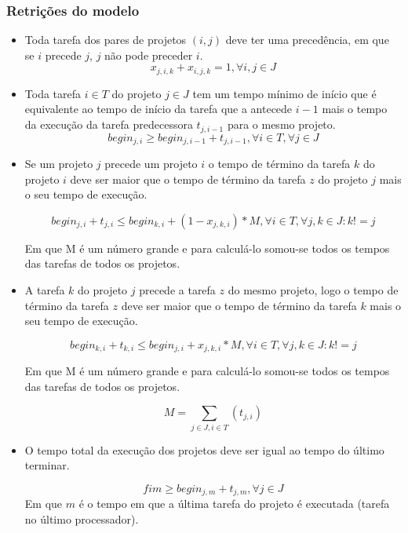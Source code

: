\documentclass[11pt,letterpaper]{article}
\begin{document}
\subsubsection*{Retrições do modelo}
\begin{itemize}
\item Toda tarefa dos pares de projetos $(i,j)$ deve ter uma precedência, em que se $i$
  precede $j$, $j$ não pode preceder $i$. 
\begin{equation*}
  x_{j,i,k}+x_{i,j,k}=1, \forall i,j \in J
\end{equation*}

\item Toda tarefa $i \in T$ do projeto  $j \in J$ tem um tempo mínimo de início que é equivalente ao tempo de início da tarefa que a antecede $i -1$ mais o tempo da execução da tarefa predecessora $ t_{j,i-1}$ para o mesmo projeto. 
\begin{equation*}
  begin_{j,i} \geq begin_{j,i-1}+ t_{j,i-1}, \forall i \in T, \forall j \in J
\end{equation*}

\item Se um projeto $j$ precede um projeto $i$ o tempo de término da
  tarefa $k$ do projeto $i$ deve ser maior que o tempo de término da
  tarefa $z$ do projeto $j$ mais o seu tempo de execução.
 
\begin{equation*}
  begin_{j,i} + t_{j,i} \leq begin_{k,i}+(1-x_{j,k,i})*M, \forall i \in T, \forall j,k \in J  : k!=j 
\end{equation*}


Em que M é um número grande e para calculá-lo somou-se todos os tempos
das tarefas de todos os projetos. 

\item A tarefa $k$ do projeto $j$ precede a tarefa $z$ do mesmo
  projeto, logo o tempo de término da
  tarefa $z$ deve ser maior que o tempo de término da
  tarefa $k$ mais o seu tempo de execução.
 
\begin{equation*}
  begin_{k,i} + t_{k,i} \leq begin_{j,i}+x_{j,k,i}*M, \forall i \in T , \forall j,k \in J : k!=j 
\end{equation*}

Em que M é um número grande e para calculá-lo somou-se todos os tempos
das tarefas de todos os projetos. 


\begin{equation*}
 M = \sum_{j \in J,i \in T} (t_{j,i}) 
\end{equation*}

\item O tempo total da execução dos projetos deve ser igual ao tempo
  do último terminar.
 
\begin{equation*}
 fim \geq begin_{j,m}+ t_{j,m}, \forall j \in J
\end{equation*}
Em que $m$ é o tempo em que a última tarefa do projeto é executada
(tarefa no último processador).
\end{itemize}
\end{document}
